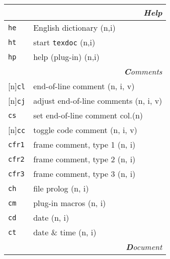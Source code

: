 \documentclass[oneside,10pt,landscape,DIV17]{scrartcl}
\newcommand{\Rep}{{\scriptsize{[n]}}}
\newcommand{\Map}[1] {\textbf{\textasciiacute}\texttt{#1}}
\begin{document}
\begin{multicols}{3}
\begin{center}
\begin{tabular}[]{|p{11mm}|p{60mm}|}
\hline 
\multicolumn{2}{|r|}{\textsl{\textbf{H}elp}}\\[1.0ex]
\hline \Map{he}   & English dictionary              \hfill (n,i)\\
\hline \Map{ht}   & start \texttt{texdoc}           \hfill (n,i)\\
\hline \Map{hp}   & help (plug-in)                  \hfill (n,i)\\
\hline 
\hline
\multicolumn{2}{|r|}{\textsl{\textbf{C}omments}}    \\[1.0ex]
\hline \Rep\Map{cl}   & end-of-line comment         \hfill (n, i, v)\\
\hline \Rep\Map{cj}   & adjust end-of-line comments \hfill (n, i, v)\\
\hline     \Map{cs}   & set end-of-line comment col.\hfill (n)      \\
%
\hline \Rep\Map{cc}   & toggle code comment         \hfill (n, i, v)\\
%
\hline     \Map{cfr1} & frame comment, type 1       \hfill (n, i)   \\
\hline     \Map{cfr2} & frame comment, type 2       \hfill (n, i)   \\
\hline     \Map{cfr3} & frame comment, type 3       \hfill (n, i)   \\
\hline     \Map{ch}   & file prolog                 \hfill (n, i)   \\
\hline     \Map{cm}   & plug-in macros              \hfill (n, i)   \\
\hline     \Map{cd}   & date                        \hfill (n, i)   \\
\hline     \Map{ct}   & date \& time                \hfill (n, i)   \\
\hline
\hline
\multicolumn{2}{|r|}{\textsl{\textbf{D}ocument}}                 \\[1.0ex]

\end{tabular}
\end{center}
\end{multicols}
\end{document}

